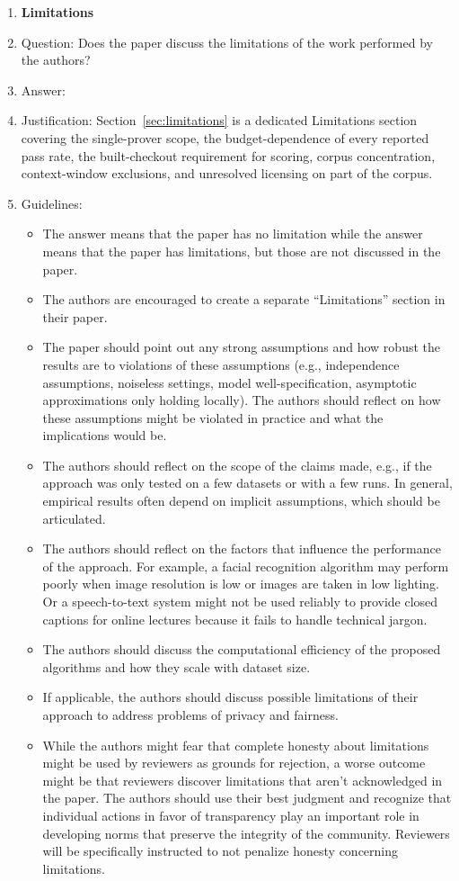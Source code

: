 \begin{enumerate}
\item {\bf Limitations}
    \item[] Question: Does the paper discuss the limitations of the work performed by the authors?
    \item[] Answer: \answerYes{}
    \item[] Justification: Section~\ref{sec:limitations} is a dedicated Limitations section covering the single-prover scope, the budget-dependence of every reported pass rate, the built-checkout requirement for scoring, corpus concentration, context-window exclusions, and unresolved licensing on part of the corpus.
    \item[] Guidelines:
    \begin{itemize}
        \item The answer \answerNA{} means that the paper has no limitation while the answer \answerNo{} means that the paper has limitations, but those are not discussed in the paper. 
        \item The authors are encouraged to create a separate ``Limitations'' section in their paper.
        \item The paper should point out any strong assumptions and how robust the results are to violations of these assumptions (e.g., independence assumptions, noiseless settings, model well-specification, asymptotic approximations only holding locally). The authors should reflect on how these assumptions might be violated in practice and what the implications would be.
        \item The authors should reflect on the scope of the claims made, e.g., if the approach was only tested on a few datasets or with a few runs. In general, empirical results often depend on implicit assumptions, which should be articulated.
        \item The authors should reflect on the factors that influence the performance of the approach. For example, a facial recognition algorithm may perform poorly when image resolution is low or images are taken in low lighting. Or a speech-to-text system might not be used reliably to provide closed captions for online lectures because it fails to handle technical jargon.
        \item The authors should discuss the computational efficiency of the proposed algorithms and how they scale with dataset size.
        \item If applicable, the authors should discuss possible limitations of their approach to address problems of privacy and fairness.
        \item While the authors might fear that complete honesty about limitations might be used by reviewers as grounds for rejection, a worse outcome might be that reviewers discover limitations that aren't acknowledged in the paper. The authors should use their best judgment and recognize that individual actions in favor of transparency play an important role in developing norms that preserve the integrity of the community. Reviewers will be specifically instructed to not penalize honesty concerning limitations.
    \end{itemize}


\end{enumerate}

